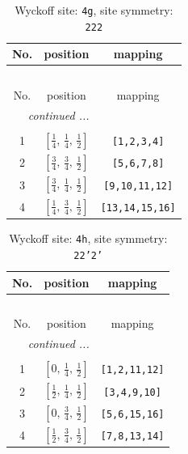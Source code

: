 \documentclass[fleqn,8pt]{jsarticle}
\begin{document}
\renewcommand{\arraystretch}{1.2}
\begin{longtable}{ccc}
\caption{Wyckoff site: {\tt 4g}, site symmetry: {\tt 222}}
 \\
 \hline \hline
No. & position & mapping \\ \hline \endfirsthead

\multicolumn{2}{l}{\tablename\ \thetable{}} \\
 \hline \hline
No. & position & mapping \\ \hline \endhead

 \hline \hline
\multicolumn{2}{r}{\footnotesize\it continued ...} \\ \endfoot

 \hline \hline
\multicolumn{2}{r}{} \\ \endlastfoot

1 & $\left[ \frac{1}{4},\, \frac{1}{4},\, \frac{1}{2} \right]$ & {\tt [1,2,3,4]} \\ \hline
2 & $\left[ \frac{3}{4},\, \frac{3}{4},\, \frac{1}{2} \right]$ & {\tt [5,6,7,8]} \\ \hline
3 & $\left[ \frac{3}{4},\, \frac{1}{4},\, \frac{1}{2} \right]$ & {\tt [9,10,11,12]} \\ \hline
4 & $\left[ \frac{1}{4},\, \frac{3}{4},\, \frac{1}{2} \right]$ & {\tt [13,14,15,16]} \\
\end{longtable}
\renewcommand{\arraystretch}{1.2}
\begin{longtable}{ccc}
\caption{Wyckoff site: {\tt 4h}, site symmetry: {\tt 22'2'}}
 \\
 \hline \hline
No. & position & mapping \\ \hline \endfirsthead

\multicolumn{2}{l}{\tablename\ \thetable{}} \\
 \hline \hline
No. & position & mapping \\ \hline \endhead

 \hline \hline
\multicolumn{2}{r}{\footnotesize\it continued ...} \\ \endfoot

 \hline \hline
\multicolumn{2}{r}{} \\ \endlastfoot

1 & $\left[ 0,\, \frac{1}{4},\, \frac{1}{2} \right]$ & {\tt [1,2,11,12]} \\ \hline
2 & $\left[ \frac{1}{2},\, \frac{1}{4},\, \frac{1}{2} \right]$ & {\tt [3,4,9,10]} \\ \hline
3 & $\left[ 0,\, \frac{3}{4},\, \frac{1}{2} \right]$ & {\tt [5,6,15,16]} \\ \hline
4 & $\left[ \frac{1}{2},\, \frac{3}{4},\, \frac{1}{2} \right]$ & {\tt [7,8,13,14]} \\
\end{longtable}
\end{document}
